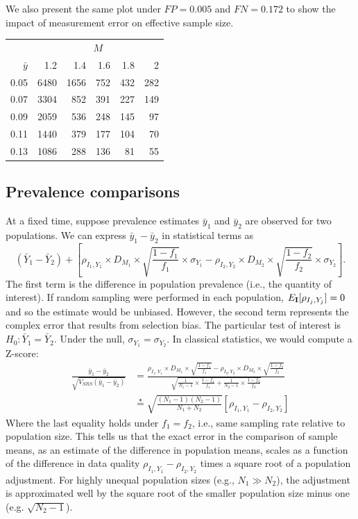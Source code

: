 \documentclass[12pt]{article}
\def\I{{\bf I}}
\begin{document}
We also present the same plot under $FP = 0.005$ and $FN = 0.172$ to show the impact of measurement error on effective sample size.

\begin{table}[ht]
\centering
\begin{tabular}{rrrrrr}
& \multicolumn{5}{c}{$M$} \\ \cline{2-6}
$\bar y$ & 1.2 & 1.4 & 1.6 & 1.8 & 2 \\
  \hline
0.05 & 6480 & 1656 & 752 & 432 & 282 \\
  0.07 & 3304 & 852 & 391 & 227 & 149 \\
  0.09 & 2059 & 536 & 248 & 145 & 97 \\
  0.11 & 1440 & 379 & 177 & 104 & 70 \\
  0.13 & 1086 & 288 & 136 & 81 & 55 \\
   \hline
\end{tabular}
\end{table}

\subsection*{Prevalence comparisons}

At a fixed time, suppose prevalence estimates $\bar y_1$ and $\bar y_2$ are observed for two populations. We can express $\bar y_1 - \bar y_2$ in statistical terms as
$$
(\bar Y_1 - \bar Y_2) + \left[ \rho_{I_1, Y_1} \times D_{M_1} \times \sqrt{\frac{1-f_1}{f_1}} \times \sigma_{Y_1}  - \rho_{I_2, Y_2} \times D_{M_2} \times \sqrt{\frac{1-f_2}{f_2}} \times \sigma_{Y_2} \right].
$$
The first term is the difference in population prevalence (i.e., the quantity of interest).  If random sampling were performed in each population, $E_{\I} [ \rho_{I_j, Y_j}] = 0$ and so the estimate would be unbiased.  However, the second term represents the complex error that results from selection bias.
The particular test of interest is $H_0: \bar Y_1 = \bar Y_2$.  Under the null, $\sigma_{Y_1} = \sigma_{Y_2}$.  In classical statistics, we would compute a Z-score:
$$
\begin{aligned}
\frac{\bar y_1 - \bar y_2}{ \sqrt{V_{SRS} (\bar y_1 - \bar y_2)} } &=
\frac{\rho_{I_1, Y_1} \times D_{M_1} \times \sqrt{\frac{1-f_1}{f_1}}  - \rho_{I_2, Y_2} \times D_{M_2} \times \sqrt{\frac{1-f_2}{f_2}} }{ \sqrt{\frac{1}{N_1 -1} \times \frac{1-f_1}{f_1} + \frac{1}{N_2 - 1} \times \frac{1-f_2}{f_2}} }  \\
&\overset{\star}{=}
\sqrt{\frac{(N_1-1)(N_2 -1)}{N_1 + N_2}} \left[ \rho_{I_1, Y_1} - \rho_{I_2, Y_2} \right]
\end{aligned}
$$
Where the last equality holds under $f_1 = f_2$, i.e., same sampling rate relative to population size. This tells us that the exact error in the comparison of sample means, as an estimate of the difference in population means, scales as a function of the difference in data quality $\rho_{I_1, Y_1} - \rho_{I_2, Y_2}$ times a square root of a population adjustment.  For highly unequal population sizes (e.g., $N_1 \gg N_2$), the adjustment is approximated well by the square root of the smaller population size minus one (e.g. $\sqrt{N_2 -1}$).
\end{document}
